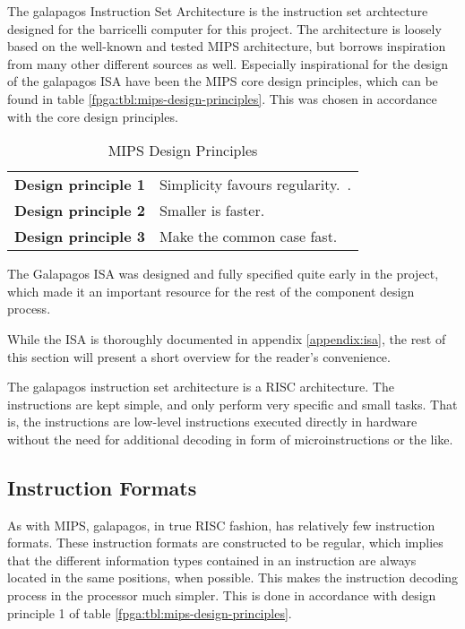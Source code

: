 The \Gls{galapagos} Instruction Set Architecture is the instruction set archtecture designed for the \Gls{barricelli} computer for this project.
The architecture is loosely based on the well-known and tested \gls{MIPS} architecture\cn, but borrows inspiration from many other different sources as well.
Especially inspirational for the design of the \Gls{galapagos} ISA have been the \gls{MIPS} core design principles, which can be found in table \vref{fpga:tbl:mips-design-principles}.
This was chosen in accordance with the core design principles.

\begin{table}[H]
\centering
    \begin{tabular}{l l} 
     \textbf{Design principle 1} & Simplicity favours regularity.~\cite[p.~79]{compOrgDes}. \\
     \textbf{Design principle 2} & Smaller is faster.~\cite[p.~81]{compOrgDes} \\
     \textbf{Design principle 3} & Make the common case fast.~\cite[p.~86]{compOrgDes} \\
    \hline
\end{tabular}
    \caption{MIPS Design Principles}
    \label{fpga:tbl:mips-design-principles}
\end{table}

The Galapagos ISA was designed and fully specified quite early in the project, which made it an important resource for the rest of the component design process.

While the ISA is thoroughly documented in appendix \vref{appendix:isa}, the rest of this section will present a short overview for the reader's convenience.





The \Gls{galapagos} instruction set architecture is a RISC architecture.
The instructions are kept simple, and only perform very specific and small tasks.
That is, the instructions are low-level instructions executed directly in hardware without the need for additional decoding in form of microinstructions or the like.

\subsection{Instruction Formats}

As with \Gls{MIPS}, \Gls{galapagos}, in true \gls{RISC} fashion, has relatively few instruction formats.
These instruction formats are constructed to be regular, which implies that the different information types contained in an instruction are always located in the same positions, when possible.
This makes the instruction decoding process in the processor much simpler.
This is done in accordance with design principle 1 of table \vref{fpga:tbl:mips-design-principles}.

